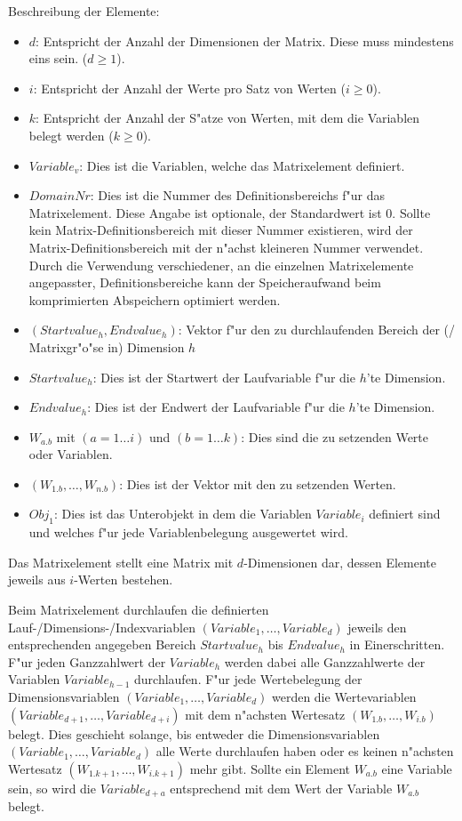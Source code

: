 \bigskip\noindent
Beschreibung der Elemente:
\begin{itemize}
 \item $d$: Entspricht der Anzahl der Dimensionen der Matrix. Diese muss mindestens eins sein. ($d \geq 1$).
 \item $i$: Entspricht der Anzahl der Werte pro Satz von Werten ($i \geq 0$).
 \item $k$: Entspricht der Anzahl der S"atze von Werten, mit dem die Variablen belegt werden ($k \geq 0$).
 \item $Variable_v$: Dies ist die Variablen, welche das Matrixelement definiert.
 \item $DomainNr$: Dies ist die Nummer des Definitionsbereichs f"ur das Matrixelement. Diese Angabe ist optionale, der Standardwert ist 0. Sollte kein Matrix-Definitionsbereich mit dieser Nummer existieren, wird der Matrix-Definitionsbereich mit der n"achst kleineren Nummer verwendet. Durch die Verwendung verschiedener, an die einzelnen Matrixelemente angepasster, Definitionsbereiche kann der Speicheraufwand beim komprimierten Abspeichern optimiert werden.
 \item $(Startvalue_h, Endvalue_h)$: Vektor f"ur den zu durchlaufenden Bereich der (/ Matrixgr"o"se in) Dimension $h$
 \item $Startvalue_h$: Dies ist der Startwert der Laufvariable f"ur die $h$'te Dimension.
 \item $Endvalue_h$: Dies ist der Endwert der Laufvariable f"ur die $h$'te Dimension.
 \item $W_{a.b}$ mit $(a = 1 \ldots i)$ und $(b = 1 \ldots k)$: Dies sind die zu setzenden Werte oder Variablen.
 \item $(W_{1.b}, \ldots, W_{n.b})$: Dies ist der Vektor mit den zu setzenden Werten.
 \item $Obj_1$: Dies ist das Unterobjekt in dem die Variablen $Variable_i$ definiert sind und welches f"ur jede Variablenbelegung ausgewertet wird.
\end{itemize}

Das Matrixelement stellt eine Matrix mit $d$-Dimensionen dar, dessen Elemente jeweils aus $i$-Werten bestehen.

Beim Matrixelement durchlaufen die definierten Lauf-/Dimensions-/Index\-vari\-ablen $(Variable_1, \ldots, Variable_d)$ jeweils den entsprechenden angegeben Bereich $Startvalue_h$ bis $Endvalue_h$ in Einerschritten. F"ur jeden Ganzzahlwert der $Variable_h$ werden dabei alle Ganzzahlwerte der Variablen $Variable_{h-1}$ durchlaufen. F"ur jede Wertebelegung der Dimensionsvariablen $(Variable_1, \ldots, Variable_d)$ werden die Wertevariablen $(Variable_{d+1}, \ldots, Variable_{d+i})$ mit dem n"achsten Wertesatz $(W_{1.b}, \ldots, W_{i.b})$ belegt. Dies geschieht solange, bis entweder die Dimensionsvariablen $(Variable_1, \ldots, Variable_d)$ alle Werte durchlaufen haben oder es keinen n"achsten Wertesatz $(W_{1.k+1}, \ldots, W_{i.k+1})$ mehr gibt. Sollte ein Element $W_{a.b}$ eine Variable sein, so wird die $Variable_{d+a}$ entsprechend mit dem Wert der Variable $W_{a.b}$ belegt.

